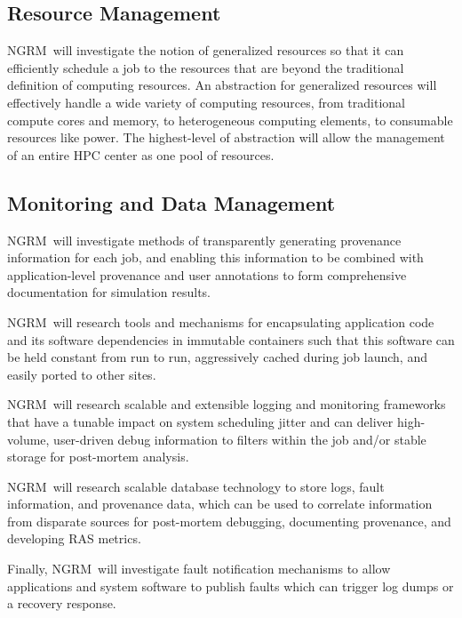 \documentclass{article}
\newcommand{\ngrm}{NGRM}
\begin{document}
\subsection{Resource Management}

\ngrm\ will investigate the notion of generalized resources so that
it can efficiently schedule a job to the resources that are beyond the
traditional definition of computing resources. An abstraction for
generalized resources will effectively handle a wide variety of computing
resources, from traditional compute cores and memory, to heterogeneous
computing elements, to consumable resources like power.
The highest-level of abstraction will allow the management of an
entire HPC center as one pool of resources.

\subsection{Monitoring and Data Management}

\ngrm\ will investigate methods of transparently generating provenance
information for each job, and enabling this information to be combined
with application-level provenance and user annotations to form
comprehensive documentation for simulation results.

\ngrm\ will research tools and mechanisms for encapsulating application
code and its software dependencies in immutable containers such that
this software can be held constant from run to run, aggressively
cached during job launch, and easily ported to other sites.

\ngrm\ will research scalable and extensible logging and monitoring
frameworks that have a tunable impact on system scheduling jitter and
can deliver high-volume, user-driven debug information to filters within
the job and/or stable storage for post-mortem analysis.

\ngrm\ will research scalable database technology to store
logs, fault information, and provenance data, which can be used
to correlate information from disparate sources for post-mortem debugging,
documenting provenance, and developing RAS metrics.

Finally, \ngrm\ will investigate fault notification mechanisms
to allow applications and system software to publish
faults which can trigger log dumps or a recovery response.

\end{document}
